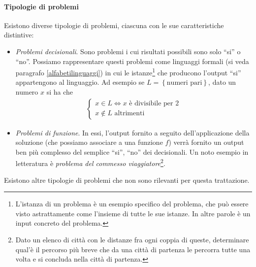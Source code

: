 \documentclass{article}
\theoremstyle{definition}
\begin{document}
\paragraph{Tipologie di problemi}
Esistono diverse tipologie di problemi, ciascuna con le sue caratteristiche distintive:
\begin{itemize}
    \item \emph{Problemi decisionali}. Sono problemi i cui risultati possibili sono solo  ``si'' o ``no''. Possiamo rappresentare questi problemi come linguaggi formali (si veda paragrafo \ref{alfabetilinguaggi}) 
    in cui le istanze\footnote{L'istanza di un problema è un esempio specifico del problema, che può essere visto astrattamente come l'insieme di tutte le sue istanze. In altre parole è un input concreto del problema.} che producono l'output ``si'' appartengono al linguaggio. Ad esempio se $L = \left\{ \text{numeri pari} \right\}$, dato un numero $x$ si ha che
    \begin{align*}
    \begin{cases}
    x \in L \Leftrightarrow x \text{ è divisibile per }2\\
    x \notin L \text{ altrimenti}
    \end{cases}
    \end{align*}
    \item \emph{Problemi di funzione}. In essi, l'output fornito a seguito dell'applicazione della soluzione (che possiamo associare a una funzione $f$) verrà fornito un output ben più complesso del semplice ``si'', ``no'' dei decisionali. Un noto esempio in letteratura è \emph{problema del commesso viaggiatore}\footnote{Dato un elenco di città con le distanze fra ogni coppia di queste, determinare qual'è il percorso più breve che da una città di partenza le percorra tutte una volta e si concluda nella città di partenza.}.
\end{itemize} 
Esistono altre tipologie di problemi che non sono rilevanti per questa trattazione.
\end{document}

